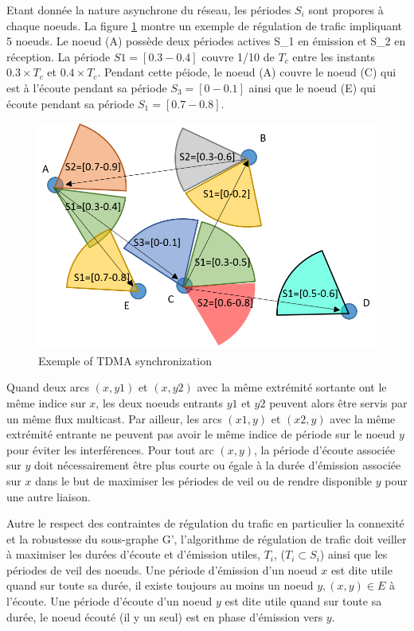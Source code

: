 \documentclass[sigconf]{acmart}
\begin{document}
Etant donnée la nature asynchrone du réseau, les périodes $S_i$ sont propores à chaque noeuds. La figure \ref{trafficregulation} montre un exemple de régulation de trafic impliquant 5 noeuds. Le noeud (A) possède deux périodes actives S_1 en émission et S_2 en réception. La période $S1=[0.3-0.4]$ couvre 1/10 de $T_{c}$ entre les instants $0.3\times T_{c}$ et $0.4\times T_{c}$. Pendant cette péiode, le noeud (A) couvre le noeud (C) qui est à l'écoute pendant sa période $S_3=[0-0.1]$ ainsi que le noeud (E) qui écoute pendant sa période $S_1=[0.7-0.8]$. 

\begin{figure}[h]
\centering
\includegraphics[width=\columnwidth]{trafficregulation.png}
\caption{Exemple of TDMA synchronization}
\label{trafficregulation}
\end{figure}


Quand deux arcs $(x,y1)$ et $(x,y2)$ avec la même extrémité sortante ont le même indice sur $x$, les deux noeuds entrants $y1$ et $y2$ peuvent alors être servis par un même flux multicast. Par ailleur, les arcs $(x1,y)$ et $(x2,y)$ avec la même extrémité entrante ne peuvent pas avoir le même indice de période sur le noeud $y$ pour éviter les interférences. Pour tout arc $(x,y)$, la période d'écoute associée sur $y$ doit  nécessairement être plus courte ou égale à la durée d'émission associée sur $x$ dans le but de maximiser les périodes de veil ou de rendre disponible $y$ pour une autre liaison.

Autre le respect des contraintes de régulation du trafic en particulier la connexité et la robustesse du sous-graphe G', l'algorithme de régulation de trafic doit veiller à maximiser les durées d'écoute et d'émission utiles, $T_i$, ($T_i \subset S_i$) ainsi que les périodes de veil des noeuds. Une période d'émission d'un noeud $x$ est dite utile quand sur toute sa durée, il existe toujours au moins un noeud $y, (x,y)\in E$ à l'écoute. Une période d'écoute d'un noeud $y$ est dite utile quand sur toute sa durée, le noeud écouté (il y un seul) est en phase d'émission vers $y$. 
\end{document}
